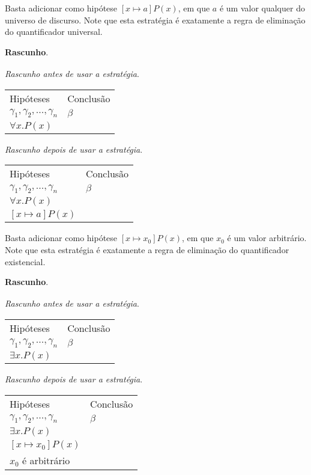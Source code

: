 \begin{HypothesisStrategy}
Basta adicionar como hipótese $[x\mapsto a]P(x)$, em que $a$ é um
valor qualquer do universo de discurso. Note que esta estratégia é exatamente a regra de
eliminação do quantificador universal.
\begin{flushleft}
 \textbf{Rascunho}.\\
\verb| |\\

\textit{Rascunho antes de usar a estratégia}.
\verb| |\\
\begin{tabular}{ll}
Hipóteses & Conclusão \\
$\gamma_1,\gamma_2,...,\gamma_n$ & $\beta$\\
$\forall x. P(x)$ & \\
\end{tabular}

\textit{Rascunho depois de usar a estratégia}.
\verb| |\\
\begin{tabular}{ll}
Hipóteses & Conclusão \\
$\gamma_1,\gamma_2,...,\gamma_n$ & $\beta$\\
$\forall x. P(x)$ & \\
$[x\mapsto a]P(x)$ & \\
\end{tabular}
\end{flushleft}
\end{HypothesisStrategy}

\begin{HypothesisStrategy}
Basta adicionar como hipótese $[x\mapsto x_0]P(x)$, em que $x_0$ é um
valor arbitrário. Note que esta estratégia é exatamente a regra de
eliminação do quantificador existencial.
\begin{flushleft}
 \textbf{Rascunho}.\\
\verb| |\\

\textit{Rascunho antes de usar a estratégia}.
\verb| |\\
\begin{tabular}{ll}
Hipóteses & Conclusão \\
$\gamma_1,\gamma_2,...,\gamma_n$ & $\beta$\\
$\exists x. P(x)$ & \\
\end{tabular}

\textit{Rascunho depois de usar a estratégia}.
\verb| |\\
\begin{tabular}{ll}
Hipóteses & Conclusão \\
$\gamma_1,\gamma_2,...,\gamma_n$ & $\beta$\\
$\exists x. P(x)$ & \\
$[x\mapsto x_0]P(x)$ & \\
$x_0$ é arbitrário & \\
\end{tabular}
\end{flushleft}
\end{HypothesisStrategy}

